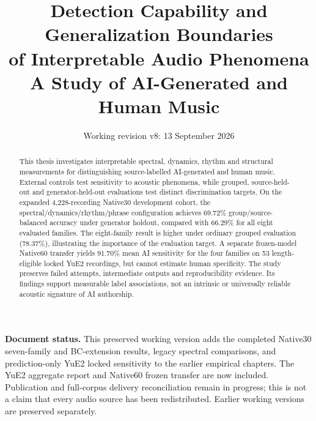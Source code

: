 \documentclass[11pt,a4paper]{article}
\title{Detection Capability and Generalization Boundaries\\of Interpretable Audio Phenomena\\
\large A Study of AI-Generated and Human Music}
\author{}
\date{Working revision v8: 13 September 2026}
\begin{document}
\maketitle
\noindent\textbf{Document status.} This preserved working version adds the completed
Native30 seven-family and BC-extension results, legacy spectral comparisons,
and prediction-only YuE2 locked sensitivity to the earlier empirical chapters.
The YuE2 aggregate report and Native60 frozen transfer are now included.
Publication and full-corpus delivery reconciliation remain in progress; this is
not a claim that every audio source has been redistributed. Earlier working
versions are preserved separately.
\begin{abstract}
This thesis investigates interpretable spectral, dynamics, rhythm and structural
measurements for distinguishing source-labelled AI-generated and human music.
External controls test sensitivity to acoustic phenomena, while grouped,
source-held-out and generator-held-out evaluations test distinct discrimination
targets. On the expanded 4,228-recording Native30 development cohort, the
spectral/dynamics/rhythm/phrase configuration achieves 69.72\% group/source-balanced
accuracy under generator holdout, compared with 66.29\% for all eight evaluated
families. The eight-family result is higher under ordinary grouped evaluation
(78.37\%), illustrating the importance of the evaluation target. A separate
frozen-model Native60 transfer yields 91.70\% mean AI sensitivity for the four
families on 53 length-eligible locked YuE2 recordings, but cannot estimate human
specificity. The study preserves failed attempts, intermediate outputs and
reproducibility evidence. Its findings support measurable label associations,
not an intrinsic or universally reliable acoustic signature of AI authorship.
\end{abstract}
\tableofcontents
\clearpage















\end{document}
